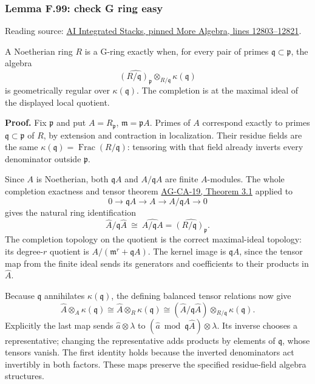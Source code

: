 \documentclass[11pt,a4paper,openany]{report}
\begin{document}
\label{AG-RG-S05-more-algebra-lemma-check-G-ring-easy}

\subsubsection{Lemma F.99: check G ring easy}\label{AG-RG-S05-lemma-f.99-check-g-ring-easy}

Reading source: \href{https://github.com/KokunoYumeto/unofficial-stacks-project-ai-drafts/blob/565b10e987aba5969b21145a0833f42d69f96790/more-algebra.tex\#L12803-L12821}{AI Integrated Stacks, pinned More Algebra, lines 12803--12821}.

A Noetherian ring \(R\) is a G-ring exactly when, for every pair of primes \(\mathfrak q\subset\mathfrak p\), the algebra \[
\widehat{(R/\mathfrak q)_{\mathfrak p}}\otimes_{R/\mathfrak q}\kappa(\mathfrak q)
\] is geometrically regular over \(\kappa(\mathfrak q)\). The completion is at the maximal ideal of the displayed local quotient.

\textbf{Proof.} Fix \(\mathfrak p\) and put \(A=R_{\mathfrak p}\), \(\mathfrak m=\mathfrak pA\). Primes of \(A\) correspond exactly to primes \(\mathfrak q\subset\mathfrak p\) of \(R\), by extension and contraction in localization. Their residue fields are the same \(\kappa(\mathfrak q)=\operatorname{Frac}(R/\mathfrak q)\): tensoring with that field already inverts every denominator outside \(\mathfrak p\).

Since \(A\) is Noetherian, both \(\mathfrak qA\) and \(A/\mathfrak qA\) are finite \(A\)-modules. The whole completion exactness and tensor theorem \href{https://github.com/KokunoYumeto/open-math-courses/blob/d02d0a3669f42579db037cd44de1d113fdd770a1/docs/courses/AG-CA/src/completion.md}{AG-CA-19, Theorem 3.1} applied to \[0\longrightarrow\mathfrak qA\longrightarrow A\longrightarrow A/\mathfrak qA\longrightarrow0\] gives the natural ring identification \[
\widehat A/\mathfrak q\widehat A
\ \cong\ \widehat{A/\mathfrak qA}
=\widehat{(R/\mathfrak q)_{\mathfrak p}}.
\] The completion topology on the quotient is the correct maximal-ideal topology: its degree-\(r\) quotient is \(A/(\mathfrak m^r+\mathfrak qA)\). The kernel image is \(\mathfrak q\widehat A\), since the tensor map from the finite ideal sends its generators and coefficients to their products in \(\widehat A\).

Because \(\mathfrak q\) annihilates \(\kappa(\mathfrak q)\), the defining balanced tensor relations now give \[
\widehat A\otimes_A\kappa(\mathfrak q)
\cong \widehat A\otimes_R\kappa(\mathfrak q)
\cong(\widehat A/\mathfrak q\widehat A)\otimes_{R/\mathfrak q}\kappa(\mathfrak q).
\] Explicitly the last map sends \(\widehat a\otimes\lambda\) to \((\widehat a\bmod\mathfrak q\widehat A)\otimes\lambda\). Its inverse chooses a representative; changing the representative adds products by elements of \(\mathfrak q\), whose tensors vanish. The first identity holds because the inverted denominators act invertibly in both factors. These maps preserve the specified residue-field algebra structures.
\end{document}
